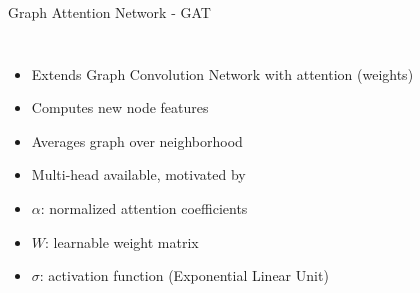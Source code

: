     

      


\begin{frame}{Graph Attention Network - GAT}
  \pause
  \begin{columns}
    \begin{itemize}
      \item Extends Graph Convolution Network with attention (weights)
      \item Computes new node features
      \item Averages graph over neighborhood
      \item Multi-head available, motivated by \cite{transformer}
      \item<3> \alert<3>{$\alpha$: normalized attention coefficients}
      \item<3> \alert<3>{$W$: learnable weight matrix}
      \item<3> \alert<3>{$\sigma$: activation function (Exponential Linear Unit)}
    \end{itemize}
    
  \end{columns}

\end{frame}


